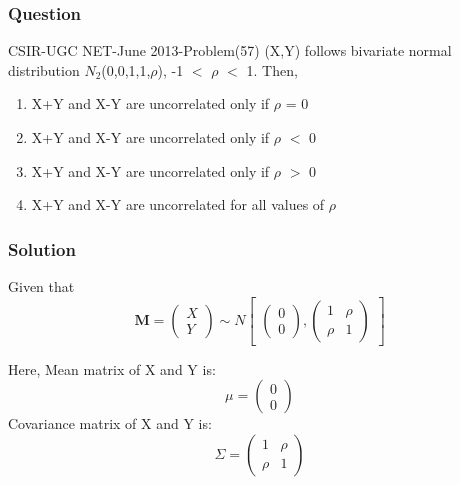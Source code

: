 \documentclass{beamer}
\renewcommand{\vec}[1]{\mathbf{#1}}
\newcommand{\myvec}[1]{\ensuremath{\begin{pmatrix}#1\end{pmatrix}}}
\begin{document}
\begin{frame}
    \frametitle{Question}
    \begin{block}{CSIR-UGC NET-June 2013-Problem(57)}
    (X,Y) follows bivariate normal distribution $N_2$(0,0,1,1,$\rho$),  -1 $<$ $\rho$ $<$ 1. Then,
    \begin{enumerate}
    \item X+Y and X-Y are uncorrelated only if $\rho$ = 0
    \item X+Y and X-Y are uncorrelated only if $\rho$ $<$ 0
    \item X+Y and X-Y are uncorrelated only if $\rho$ $>$ 0
    \item X+Y and X-Y are uncorrelated for all values of $\rho$
    \end{enumerate}
  \end{block}
\end{frame}

\begin{frame}
\frametitle{Solution}
    Given that 
    \begin{equation}
       \vec{M} = \myvec{ X \\ Y}
      \sim N \begin{bmatrix}
        \myvec{0 \\ 0},
        \begin{pmatrix}
            1 & \rho\\
            \rho & 1 
        \end{pmatrix}
        \end{bmatrix}
    \end{equation}

    Here, Mean matrix of X and Y is:
    \begin{equation}
        \mu = \myvec{0 \\ 0}
    \end{equation}
    Covariance matrix of X and Y is:
    \begin{equation}
    \Sigma = \begin{pmatrix}
                1 & \rho\\
                \rho & 1 
            \end{pmatrix}
    \end{equation}
\end{frame}
\end{document}

